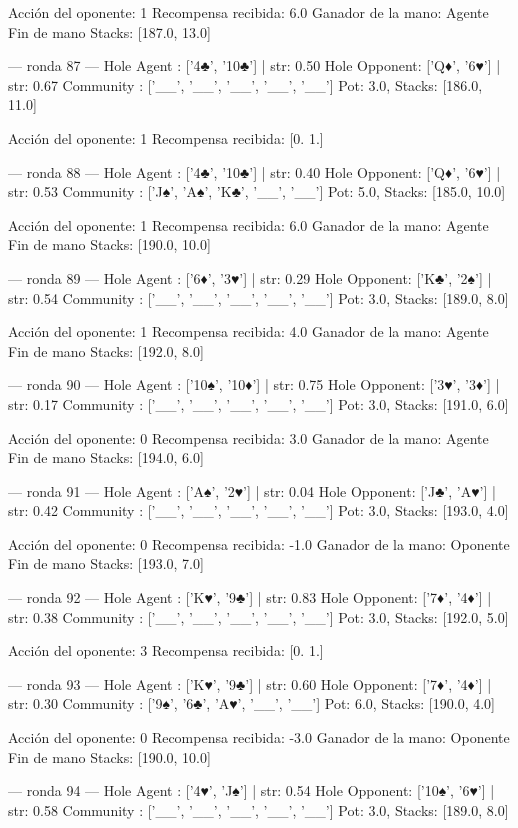 Acción del oponente: 1
Recompensa recibida: 6.0
Ganador de la mano: Agente
Fin de mano Stacks: [187.0, 13.0]


--- ronda 87 ---
Hole Agent : ['4♣', '10♣'] | str: 0.50
Hole Opponent: ['Q♦', '6♥'] | str: 0.67
Community  : ['__', '__', '__', '__', '__']
Pot: 3.0, Stacks: [186.0, 11.0]

Acción del oponente: 1
Recompensa recibida: [0. 1.]

--- ronda 88 ---
Hole Agent : ['4♣', '10♣'] | str: 0.40
Hole Opponent: ['Q♦', '6♥'] | str: 0.53
Community  : ['J♠', 'A♠', 'K♣', '__', '__']
Pot: 5.0, Stacks: [185.0, 10.0]

Acción del oponente: 1
Recompensa recibida: 6.0
Ganador de la mano: Agente
Fin de mano Stacks: [190.0, 10.0]


--- ronda 89 ---
Hole Agent : ['6♦', '3♥'] | str: 0.29
Hole Opponent: ['K♣', '2♠'] | str: 0.54
Community  : ['__', '__', '__', '__', '__']
Pot: 3.0, Stacks: [189.0, 8.0]

Acción del oponente: 1
Recompensa recibida: 4.0
Ganador de la mano: Agente
Fin de mano Stacks: [192.0, 8.0]


--- ronda 90 ---
Hole Agent : ['10♠', '10♦'] | str: 0.75
Hole Opponent: ['3♥', '3♦'] | str: 0.17
Community  : ['__', '__', '__', '__', '__']
Pot: 3.0, Stacks: [191.0, 6.0]

Acción del oponente: 0
Recompensa recibida: 3.0
Ganador de la mano: Agente
Fin de mano Stacks: [194.0, 6.0]


--- ronda 91 ---
Hole Agent : ['A♠', '2♥'] | str: 0.04
Hole Opponent: ['J♣', 'A♥'] | str: 0.42
Community  : ['__', '__', '__', '__', '__']
Pot: 3.0, Stacks: [193.0, 4.0]

Acción del oponente: 0
Recompensa recibida: -1.0
Ganador de la mano: Oponente
Fin de mano Stacks: [193.0, 7.0]


--- ronda 92 ---
Hole Agent : ['K♥', '9♣'] | str: 0.83
Hole Opponent: ['7♦', '4♦'] | str: 0.38
Community  : ['__', '__', '__', '__', '__']
Pot: 3.0, Stacks: [192.0, 5.0]

Acción del oponente: 3
Recompensa recibida: [0. 1.]

--- ronda 93 ---
Hole Agent : ['K♥', '9♣'] | str: 0.60
Hole Opponent: ['7♦', '4♦'] | str: 0.30
Community  : ['9♠', '6♣', 'A♥', '__', '__']
Pot: 6.0, Stacks: [190.0, 4.0]

Acción del oponente: 0
Recompensa recibida: -3.0
Ganador de la mano: Oponente
Fin de mano Stacks: [190.0, 10.0]


--- ronda 94 ---
Hole Agent : ['4♥', 'J♠'] | str: 0.54
Hole Opponent: ['10♠', '6♥'] | str: 0.58
Community  : ['__', '__', '__', '__', '__']
Pot: 3.0, Stacks: [189.0, 8.0]

